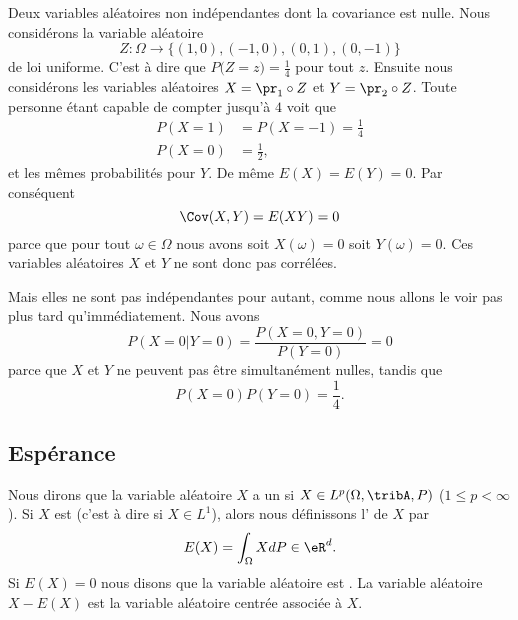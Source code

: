 \begin{example} \label{ExWLzkuWd}
    Deux variables aléatoires non indépendantes dont la covariance est nulle. Nous considérons la variable aléatoire
    \begin{equation}
        Z\colon \Omega\to \{ (1,0),(-1,0),(0,1),(0,-1) \}
    \end{equation}
    de loi uniforme. C'est à dire que \(  P\big( Z=z \big)=\frac{1}{ 4 }  \) pour tout \( z\). Ensuite nous considérons les variables aléatoires \( X=\pr_1\circ Z\) et \( Y=\pr_2\circ Z\). Toute personne étant capable de compter jusqu'à \( 4\) voit que
    \begin{subequations}
        \begin{align}
            P(X=1)&=P(X=-1)=\frac{1}{ 4 }\\
            P(X=0)&=\frac{ 1 }{2},
        \end{align}
    \end{subequations}
    et les mêmes probabilités pour \( Y\). De même \( E(X)=E(Y)=0\). Par conséquent
    \begin{equation}
        \Cov(X,Y)=E(XY)=0
    \end{equation}
    parce que pour tout \( \omega\in \Omega\) nous avons soit \( X(\omega)=0\) soit \( Y(\omega)=0\). Ces variables aléatoires \( X\) et \( Y\) ne sont donc pas corrélées.

    Mais elles ne sont pas indépendantes pour autant, comme nous allons le voir pas plus tard qu'immédiatement. Nous avons
    \begin{equation}
        P(X=0|Y=0)=\frac{ P(X=0,Y=0) }{ P(Y=0) }=0
    \end{equation}
    parce que \( X\) et \( Y\) ne peuvent pas être simultanément nulles, tandis que
    \begin{equation}
        P(X=0)P(Y=0)=\frac{1}{ 4 }.
    \end{equation}
\end{example}

\subsection{Espérance}

Nous dirons que la variable aléatoire \( X\) a un  si \( X\in L^p(\Omega,\tribA,P)\) (\( 1\leq p<\infty\)). Si \( X\) est  (c'est à dire si \( X\in L^1\)), alors nous définissons l' de \( X\) par
\begin{equation}        \label{EqdCBLst}
    E(X)=\int_{\Omega}XdP\in\eR^d.
\end{equation}
Si \( E(X)=0\) nous disons que la variable aléatoire est . La variable aléatoire \( X-E(X)\) est la variable aléatoire centrée associée à \( X\).

